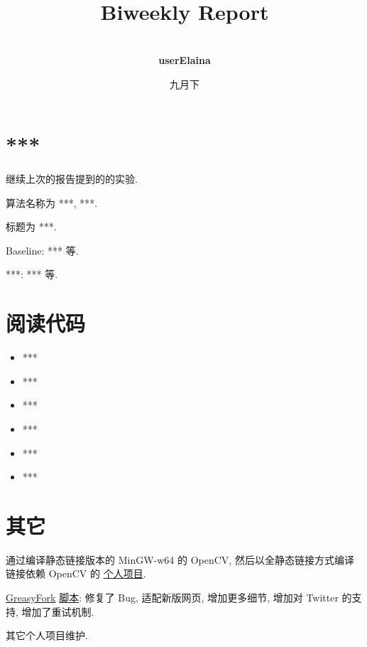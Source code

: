 \documentclass[a4paper]{article}
\title{
    \vspace*{1.0in}
     \\
    \vspace*{1in}
    \textbf{\Huge Biweekly Report}
    \vspace{0.5in}
}
\author{ \\
    \textbf{\huge userElaina} \\
    \vspace*{1in}
}
\date{\LARGE 九月下}
\begin{document}
\LARGE

\maketitle
\tableofcontents
\thispagestyle{empty}
\newpage

\section{***}

继续上次的报告提到的的实验.

算法名称为 ***, ***.

标题为 ***.

Baseline: *** 等.

***: *** 等.

\section{阅读代码}

\begin{itemize}
    \item ***
    \item ***
    \item ***
    \item ***
    \item ***
    \item ***
\end{itemize}

\section{其它}

通过编译静态链接版本的 MinGW-w64 的 OpenCV, 然后以全静态链接方式编译链接依赖 OpenCV 的 \href{https://github.com/bad-apple-lab/Bad-Apple}{个人项目}.

\href{https://greasyfork.org/zh-CN/scripts/461427-%E5%9B%BD%E9%99%85%E7%BD%91%E7%AB%99-%E4%BC%AA%E8%A3%85%E6%88%90-%E5%9B%BD%E5%86%85%E7%BD%91%E7%AB%99-%E6%B1%87%E6%80%BB}{GreasyFork} \href{https://github.com/userElaina/this-is-the-China-website}{脚本}: 修复了 Bug, 适配新版网页, 增加更多细节, 增加对 Twitter 的支持, 增加了重试机制.

其它个人项目维护.
\end{document}
